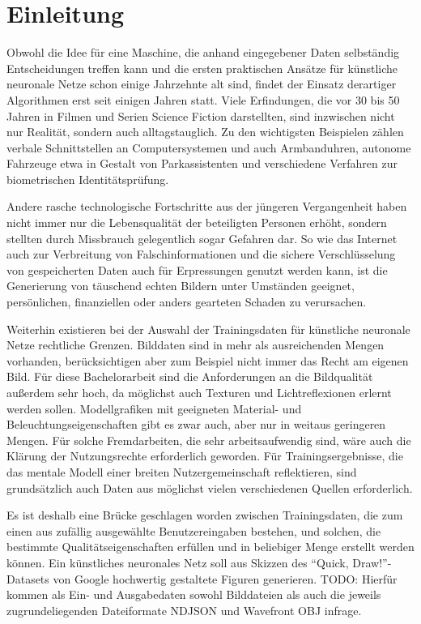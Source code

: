 \chapter{Einleitung}
\label{ch:einleitung}
Obwohl die Idee für eine Maschine, die anhand eingegebener Daten selbständig
Entscheidungen treffen kann und die ersten praktischen Ansätze für künstliche
neuronale Netze schon einige Jahrzehnte alt sind, findet der Einsatz derartiger
Algorithmen erst seit einigen Jahren statt. Viele Erfindungen, die vor 30 bis 50
Jahren in Filmen und Serien Science Fiction darstellten, sind inzwischen nicht
nur Realität, sondern auch alltagstauglich. Zu den wichtigsten Beispielen zählen
verbale Schnittstellen an Computersystemen und auch Armbanduhren, autonome
Fahrzeuge etwa in Gestalt von Parkassistenten und verschiedene Verfahren zur
biometrischen Identitätsprüfung.

Andere rasche technologische Fortschritte aus der jüngeren Vergangenheit haben
nicht immer nur die Lebensqualität der beteiligten Personen erhöht, sondern
stellten durch Missbrauch gelegentlich sogar Gefahren
dar. So wie das Internet auch zur Verbreitung von Falschinformationen und
die sichere Verschlüsselung von gespeicherten Daten auch für Erpressungen genutzt
werden kann, ist die Generierung von täuschend echten Bildern unter Umständen
geeignet, persönlichen, finanziellen oder anders gearteten Schaden zu verursachen.

Weiterhin existieren bei der Auswahl der Trainingsdaten für künstliche neuronale
Netze rechtliche Grenzen. Bilddaten sind in mehr als ausreichenden Mengen
vorhanden, berücksichtigen aber zum Beispiel nicht immer das Recht am eigenen
Bild. Für diese Bachelorarbeit sind die Anforderungen an die Bildqualität außerdem sehr
hoch, da möglichst auch Texturen und Lichtreflexionen erlernt werden sollen.
Modellgrafiken mit geeigneten Material- und Beleuchtungseigenschaften
gibt es zwar auch, aber nur in weitaus geringeren Mengen. Für solche Fremdarbeiten,
die sehr arbeitsaufwendig sind, wäre auch die Klärung der Nutzungsrechte
erforderlich geworden. Für Trainingsergebnisse, die das mentale Modell einer
breiten Nutzergemeinschaft reflektieren, sind grundsätzlich auch Daten aus
möglichst vielen verschiedenen Quellen erforderlich.

Es ist deshalb eine Brücke geschlagen worden zwischen Trainingsdaten, die
zum einen aus zufällig ausgewählte Benutzereingaben bestehen, und solchen, die
bestimmte Qualitätseigenschaften erfüllen und in beliebiger Menge erstellt werden
können. Ein künstliches neuronales Netz soll aus Skizzen des
``Quick, Draw!''-Datasets von Google hochwertig gestaltete Figuren
generieren. TODO: Hierfür kommen als Ein- und Ausgabedaten sowohl Bilddateien als
auch die jeweils zugrundeliegenden Dateiformate NDJSON und Wavefront OBJ infrage.

